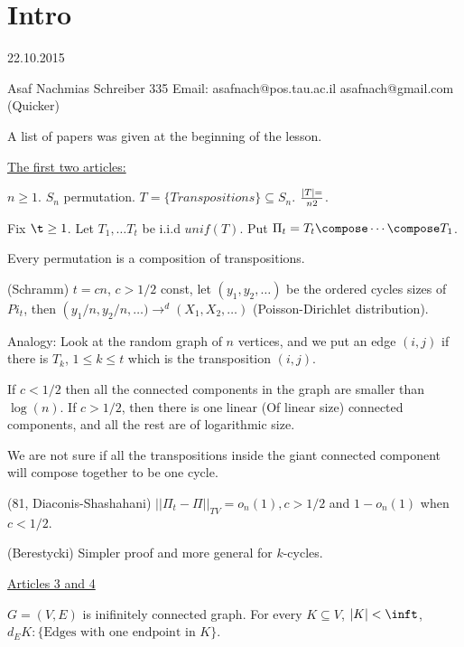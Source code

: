 \part{Intro}

22.10.2015

Asaf Nachmias
Schreiber 335
Email: asafnach@pos.tau.ac.il
       asafnach@gmail.com  (Quicker)


A list of papers was given at the beginning of the lesson.


\uline{The first two articles:}


$n \geq 1$. $S_n$ permutation.
$T = \{Transpositions\} \subseteq S_n$.
$|T| = \over{n}{2}$.

Fix $\t \geq 1$. Let $T_1, \dots T_t$ be i.i.d $unif(T)$.
Put ${\Pi}_t = T_t \compose \cdots \compose T_1$.


Every permutation is a composition of transpositions.

\begin{thm} (Schramm)
  $t = cn$, $c > 1/2$ const, let $(y_1,y_2,\dots)$ be the ordered cycles sizes
  of ${Pi}_t$, then $\left(y_1/n,y_2/n,\dots) {\rightarrow}^d (X_1,X_2,\dots)$
    (Poisson-Dirichlet distribution).
\end{thm}

Analogy: Look at the random graph of $n$ vertices, and we put an edge $(i,j)$ if
there is $T_k$, $1 \leq k \leq t$ which is the transposition $(i,j)$.


If $c < 1/2$ then all the connected components in the graph are smaller than
$\log(n)$.
If $c > 1/2$, then there is one linear (Of linear size) connected components,
and all the rest are of logarithmic size.

We are not sure if all the transpositions inside the giant connected component
will compose together to be one cycle.

\begin{thm} (81, Diaconis-Shashahani)
  $||{\Pi}_t - \Pi||_{TV} = o_n(1), c > 1/2$ and $1-o_n(1)$ when $c<1/2$.
\end{thm}

\begin{thm} (Berestycki)
Simpler proof and more general for $k$-cycles.
\end{thm}


\uline{Articles 3 and 4}

$G = (V,E)$ is inifinitely connected graph.
For every $K \subseteq V$, $|K| < \inft$, $d_E{K} : \{\mbox{Edges with one
endpoint in $K$}\}$.

